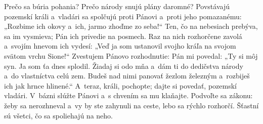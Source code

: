 Prečo sa búria pohania?
Prečo národy snujú plány daromné?
\versseparator
Povstávajú pozemskí králi
a~vladári sa spolčujú
proti Pánovi a~proti jeho pomazanému:
\versseparator
„Rozbime ich okovy
a~ich, jarmo zhoďme zo seba!“
\versseparator
Ten, čo na nebesiach prebýva, sa im vysmieva;
Pán ich privedie na posmech.
\versseparator
Raz na nich rozhorčene zavolá
a~svojím hnevom ich vydesí:
\versseparator
„Veď ja som ustanovil svojho kráľa
na svojom svätom vrchu Sione!“
Zvestujem Pánovo rozhodnutie:
\versseparator
Pán mi povedal: „Ty si môj syn.
Ja som ťa dnes splodil.
\versseparator
Žiadaj si odo mňa a~dám ti do dedičstva národy
a~do vlastníctva celú zem.
\versseparator
Budeš nad nimi panovať žezlom železným
a~rozbiješ ich jak hrnce hlinené.“
\versseparator
A~teraz, králi, pochopte;
dajte si povedať, pozemskí vladári.
\versseparator
V~bázni slúžte Pánovi
a~s chvením sa mu klaňajte.
\versseparator
Podvoľte sa zákonu: žeby sa nerozhneval
a~vy by ste zahynuli na ceste,
\versseparator
lebo sa rýchlo rozhorčí.
Šťastní sú všetci, čo sa spoliehajú na neho. 
